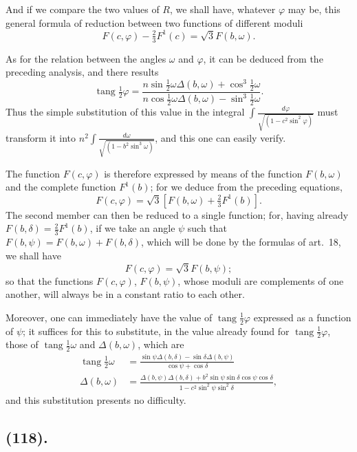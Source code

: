 \documentclass{article}
\begin{document}
And if we compare the two values of $R$, we shall have, whatever $\varphi$ may be, this general formula of reduction between two functions of different moduli
\[ F(c,\varphi)-\tfrac{2}{3}F^{1}(c)=\sqrt{3}F(b,\omega). \]


As for the relation between the angles $\omega$ and $\varphi$, it can be deduced from the preceding analysis, and there results
\[ \operatorname{tang}\tfrac{1}{2}\varphi=\frac{n\sin\tfrac{1}{2}\omega\Delta(b,\omega)+\cos^{3}\tfrac{1}{2}\omega}{n\cos\tfrac{1}{2}\omega\Delta(b,\omega)-\sin^{3}\tfrac{1}{2}\omega}. \]
Thus the simple substitution of this value in the integral $\displaystyle\int\frac{d\varphi}{\sqrt{(1-c^{2}\sin^{2}\varphi)}}$ must transform it into $n^{2}\displaystyle\int\frac{d\omega}{\sqrt{(1-b^{2}\sin^{3}\omega)}}$, and this one can easily verify.

The function $F(c,\varphi)$ is therefore expressed by means of the function $F(b,\omega)$ and the complete function $F^{1}(b)$; for we deduce from the preceding equations,
\[ F(c,\varphi)=\sqrt{3}[F(b,\omega)+\tfrac{2}{3}F^{1}(b)]. \]
The second member can then be reduced to a single function; for, having already $F(b,\delta)=\frac{2}{3}F^{1}(b)$, if we take an angle $\psi$ such that $F(b,\psi)=F(b,\omega)+F(b,\delta)$, which will be done by the formulas of art.\ 18, we shall have
\[ F(c,\varphi)=\sqrt{3}F(b,\psi); \]
so that the functions $F(c,\varphi)$, $F(b,\psi)$, whose moduli are complements of one another, will always be in a constant ratio to each other.

Moreover, one can immediately have the value of $\operatorname{tang}\frac{1}{2}\varphi$ expressed as a function of $\psi$; it suffices for this to substitute, in the value already found for $\operatorname{tang}\frac{1}{2}\varphi$, those of $\operatorname{tang}\frac{1}{2}\omega$ and $\Delta(b,\omega)$, which are
\[ \begin{aligned} \operatorname{tang}\tfrac{1}{2}\omega&=\frac{\sin\psi\Delta(b,\delta)-\sin\delta\Delta(b,\psi)}{\cos\psi+\cos\delta}\\ \Delta(b,\omega)&=\frac{\Delta(b,\psi)\Delta(b,\delta)+b^{2}\sin\psi\sin\delta\cos\psi\cos\delta}{1-c^{2}\sin^{2}\psi\sin^{2}\delta}, \end{aligned} \]
and this substitution presents no difficulty.

\subsection*{(118).}
\end{document}
